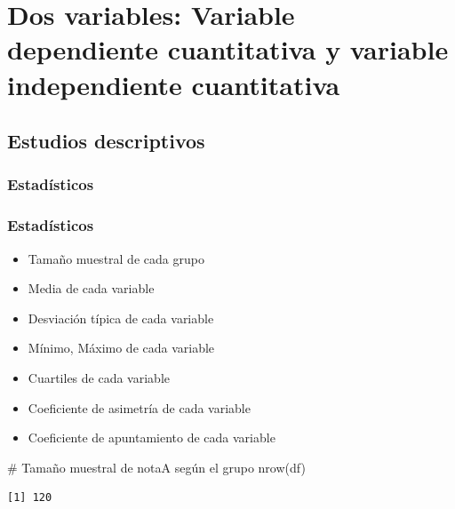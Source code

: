\documentclass[
  a4paper,
]{scrreport}
\newenvironment{Shaded}{\begin{snugshade}}{\end{snugshade}}
\newcommand{\CommentTok}[1]{\textcolor[rgb]{0.37,0.37,0.37}{#1}}
\newcommand{\FunctionTok}[1]{\textcolor[rgb]{0.28,0.35,0.67}{#1}}
\newcommand{\NormalTok}[1]{\textcolor[rgb]{0.00,0.23,0.31}{#1}}
\providecommand{\tightlist}{%
  \setlength{\itemsep}{0pt}\setlength{\parskip}{0pt}}\usepackage{longtable,booktabs,array}
\theoremstyle{definition}
\theoremstyle{definition}
\theoremstyle{remark}
\begin{document}
\hypertarget{dos-variables-variable-dependiente-cuantitativa-y-variable-independiente-cuantitativa}{%
\section{Dos variables: Variable dependiente cuantitativa y variable
independiente
cuantitativa}\label{dos-variables-variable-dependiente-cuantitativa-y-variable-independiente-cuantitativa}}

\hypertarget{estudios-descriptivos-5}{%
\subsection{Estudios descriptivos}\label{estudios-descriptivos-5}}

\hypertarget{estaduxedsticos-5}{%
\subsubsection{Estadísticos}\label{estaduxedsticos-5}}

\hypertarget{estaduxedsticos-6}{%
\subsubsection{Estadísticos}\label{estaduxedsticos-6}}

\begin{itemize}
\tightlist
\item
  Tamaño muestral de cada grupo
\item
  Media de cada variable
\item
  Desviación típica de cada variable
\item
  Mínimo, Máximo de cada variable
\item
  Cuartiles de cada variable
\item
  Coeficiente de asimetría de cada variable
\item
  Coeficiente de apuntamiento de cada variable
\end{itemize}

\begin{Shaded}
\begin{Highlighting}[]
\CommentTok{\# Tamaño muestral de notaA según el grupo}
\FunctionTok{nrow}\NormalTok{(df)}
\end{Highlighting}
\end{Shaded}

\begin{verbatim}
[1] 120
\end{verbatim}
\end{document}

